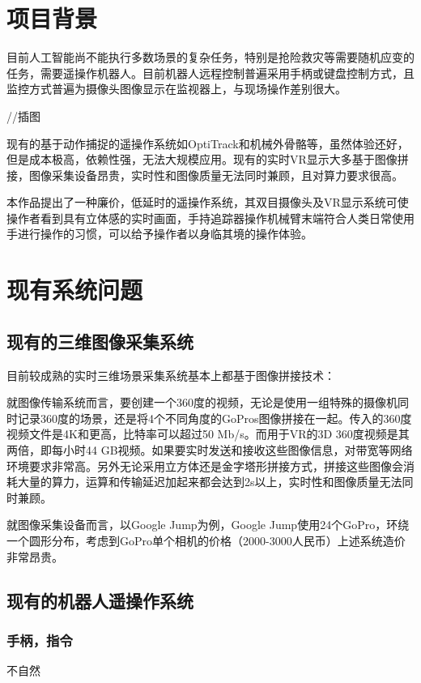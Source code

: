 \chapter{项目背景}

目前人工智能尚不能执行多数场景的复杂任务，特别是抢险救灾等需要随机应变的任务，需要遥操作机器人。目前机器人远程控制普遍采用手柄或键盘控制方式，且监控方式普遍为摄像头图像显示在监视器上，与现场操作差别很大。

//插图

现有的基于动作捕捉的遥操作系统如OptiTrack和机械外骨骼等，虽然体验还好，但是成本极高，依赖性强，无法大规模应用。现有的实时VR显示大多基于图像拼接，图像采集设备昂贵，实时性和图像质量无法同时兼顾，且对算力要求很高。

本作品提出了一种廉价，低延时的遥操作系统，其双目摄像头及VR显示系统可使操作者看到具有立体感的实时画面，手持追踪器操作机械臂末端符合人类日常使用手进行操作的习惯，可以给予操作者以身临其境的操作体验。




\chapter{现有系统问题}

\section{现有的三维图像采集系统}

目前较成熟的实时三维场景采集系统基本上都基于图像拼接技术：

就图像传输系统而言，要创建一个360度的视频，无论是使用一组特殊的摄像机同时记录360度的场景，还是将4个不同角度的GoPros图像拼接在一起。传入的360度视频文件是4K和更高，比特率可以超过50 Mb/s。而用于VR的3D 360度视频是其两倍，即每小时44 GB视频。如果要实时发送和接收这些图像信息，对带宽等网络环境要求非常高。另外无论采用立方体还是金字塔形拼接方式，拼接这些图像会消耗大量的算力，运算和传输延迟加起来都会达到2s以上，实时性和图像质量无法同时兼顾。

就图像采集设备而言，以Google Jump为例，Google Jump使用24个GoPro，环绕一个圆形分布，考虑到GoPro单个相机的价格（2000-3000人民币）上述系统造价非常昂贵。


\section{现有的机器人遥操作系统}
\subsection{手柄，指令}
不自然
